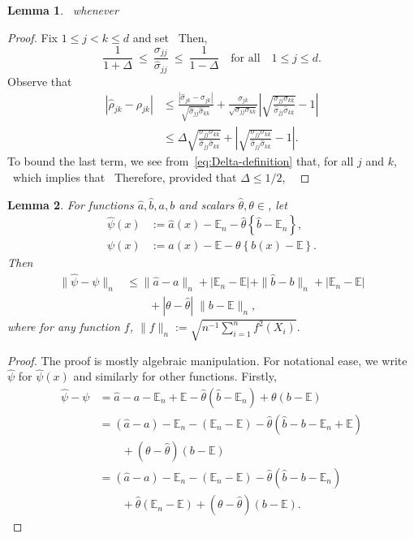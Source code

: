 \documentclass{article}
\let\hat\widehat
\newtheorem{lemma}{Lemma}
\begin{document}
\begin{appendices}
\begin{lemma}
\ whenever
\ \end{lemma}
\begin{proof}
Fix $1\le j < k\le d$ and set
\ Then,
\begin{equation}\label{eq:Delta-definition}
\frac{1}{1 + \Delta} ~\le~ \frac{\sigma_{jj}}{\widehat{\sigma}_{jj}} ~\le~ \frac{1}{1-\Delta}\quad\mbox{for all}\quad 1\le j\le d.
\end{equation}
Observe that
\begin{align*}
\left|\widehat{\rho}_{jk} - \rho_{jk}\right| &\le \frac{|\widehat{\sigma}_{jk} - \sigma_{jk}|}{\sqrt{\widehat{\sigma}_{jj}\widehat{\sigma}_{kk}}} + \frac{\sigma_{jk}}{\sqrt{\sigma_{jj}\sigma_{kk}}}\left|\sqrt{\frac{\sigma_{jj}\sigma_{kk}}{\widehat{\sigma}_{jj}\widehat{\sigma}_{kk}}} - 1\right|\\ &\le \Delta\sqrt{\frac{\sigma_{jj}\sigma_{kk}}{\widehat{\sigma}_{jj}\widehat{\sigma}_{kk}}} + \left|\sqrt{\frac{\sigma_{jj}\sigma_{kk}}{\widehat{\sigma}_{jj}\widehat{\sigma}_{kk}}} - 1\right|.
\end{align*}
To bound the last term, we see from~\eqref{eq:Delta-definition} that, for all $j$ and $k$,
\ which implies that
\ Therefore, provided that $\Delta \leq 1/2$,
\ \end{proof}
\begin{lemma}\label{lem:psihat-minus-psi-part1}
For functions $\widehat{a}, \widehat{b}, a, b$ and scalars $\hat{\theta}, \theta\in$, let
\begin{align*}
\widehat{\psi}(x) &:= \widehat{a}(x) - \mathbb{E}_n - \widehat{\theta}\left\{\widehat{b} - \mathbb{E}_n\right\},\\ \psi(x) &:= a(x) - \mathbb{E} - \theta\left\{b(x) - \mathbb{E}\right\}.
\end{align*}
Then
\begin{align*}
\|\widehat{\psi} - \psi\|_{n} &\le \|\widehat{a} - a\|_n + |\mathbb{E}_n - \mathbb{E}| + \|\widehat{b} - b\|_n + |\mathbb{E}_n - \mathbb{E}|\\ &\qquad+ |\theta - \widehat{\theta}|\;\|b - \mathbb{E}\|_n,
\end{align*}
where for any function $f$, $\|f\|_n := \sqrt{n^{-1}\sum_{i=1}^n f^2(X_i)}.$
\end{lemma}
\begin{proof}
The proof is mostly algebraic manipulation. For notational ease, we write $\widehat{\psi}$ for $\widehat{\psi}(x)$ and similarly for other functions. Firstly,
\begin{align*}
\widehat{\psi} - \psi &= \widehat{a} - a - \mathbb{E}_n + \mathbb{E} - \widehat{\theta}(\widehat{b} - \mathbb{E}_n) + \theta(b - \mathbb{E})\\ &= (\widehat{a} - a) - \mathbb{E}_n - (\mathbb{E}_n - \mathbb{E}) - \widehat{\theta}(\widehat{b} - b - \mathbb{E}_n + \mathbb{E})\\ &\qquad+ (\theta - \widehat{\theta})(b - \mathbb{E})\\ &= (\widehat{a} - a) - \mathbb{E}_n - (\mathbb{E}_n - \mathbb{E}) - \widehat{\theta}(\widehat{b} - b - \mathbb{E}_n)\\ &\qquad + \widehat{\theta}(\mathbb{E}_n - \mathbb{E}) + (\theta - \widehat{\theta})(b - \mathbb{E}).

\end{align*}
\end{proof}
\end{appendices}
\end{document}
